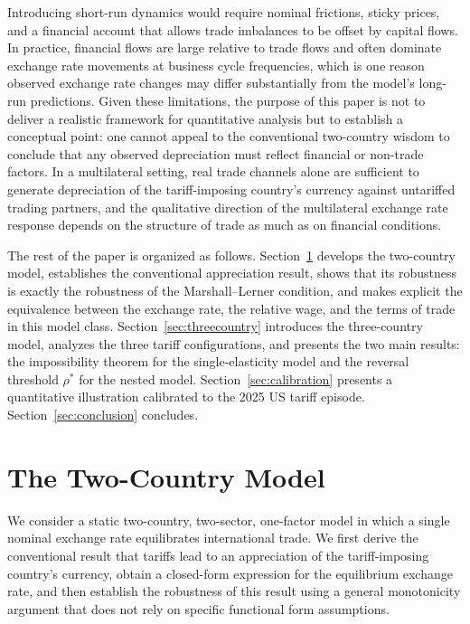 \documentclass[11pt]{article}
\theoremstyle{plain}
\theoremstyle{remark}
\numberwithin{lemma}{section}
\numberwithin{proposition}{section}
\numberwithin{corollary}{section}
\newcommand{\rev}[1]{{\color{RevBlue}#1}}
\begin{document}
Introducing short-run dynamics would require nominal frictions, sticky prices, and a financial account that allows trade imbalances to be offset by capital flows. In practice, financial flows are large relative to trade flows and often dominate exchange rate movements at business cycle frequencies, which is one reason observed exchange rate changes may differ substantially from the model's long-run predictions. Given these limitations, the purpose of this paper is not to deliver a realistic framework for quantitative analysis but to establish a conceptual point: one cannot appeal to the conventional two-country wisdom to conclude that any observed depreciation must reflect financial or non-trade factors. In a multilateral setting, real trade channels alone are sufficient to generate depreciation of the tariff-imposing country's currency against untariffed trading partners, and the qualitative direction of the multilateral exchange rate response depends on the structure of trade as much as on financial conditions.

\rev{The rest of the paper is organized as follows. Section~\ref{sec:twocountry} develops the two-country model, establishes the conventional appreciation result, shows that its robustness is exactly the robustness of the Marshall--Lerner condition, and makes explicit the equivalence between the exchange rate, the relative wage, and the terms of trade in this model class. Section~\ref{sec:threecountry} introduces the three-country model, analyzes the three tariff configurations, and presents the two main results: the impossibility theorem for the single-elasticity model and the reversal threshold $\rho^*$ for the nested model. Section~\ref{sec:calibration} presents a quantitative illustration calibrated to the 2025 US tariff episode. Section~\ref{sec:conclusion} concludes.}

\section{The Two-Country Model}
\label{sec:twocountry}

We consider a static two-country, two-sector, one-factor model in which a single nominal exchange rate equilibrates international trade. We first derive the conventional result that tariffs lead to an appreciation of the tariff-imposing country's currency, obtain a closed-form expression for the equilibrium exchange rate, and then establish the robustness of this result using a general monotonicity argument that does not rely on specific functional form assumptions.
\end{document}
